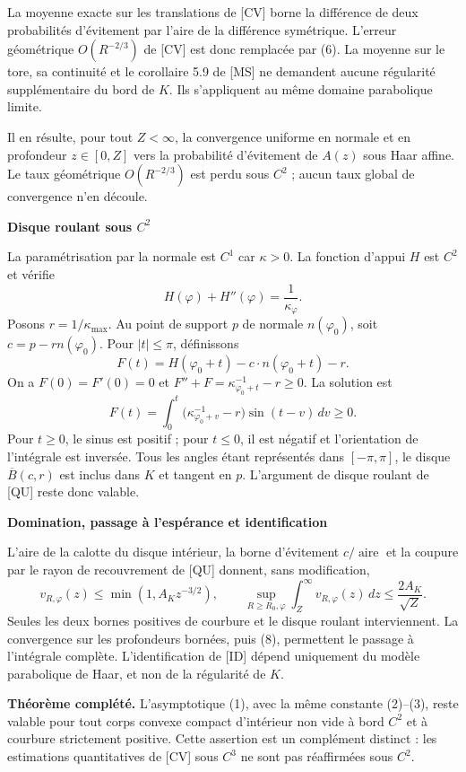 \documentclass[11pt,a4paper]{article}
\newcommand{\area}{\operatorname{aire}}
\newcommand{\head}[1]{\vspace{3pt}{\large\bfseries\color{navy}#1}\par}
\newcommand{\subhead}[1]{{\bfseries\color{navy}#1}\par}
\begin{document}
\newpage
\head{3. Complément $C^2$ : convergence et espérance}
La moyenne exacte sur les translations de [CV] borne la différence de deux probabilités d'évitement par l'aire de la différence symétrique. L'erreur géométrique $O(R^{-2/3})$ de [CV] est donc remplacée par (6). La moyenne sur le tore, sa continuité et le corollaire 5.9 de [MS] ne demandent aucune régularité supplémentaire du bord de $K$. Ils s'appliquent au même domaine parabolique limite.

Il en résulte, pour tout $Z<\infty$, la convergence uniforme en normale et en profondeur $z\in[0,Z]$ vers la probabilité d'évitement de $A(z)$ sous Haar affine. Le taux géométrique $O(R^{-2/3})$ est perdu sous $C^2$ ; aucun taux global de convergence n'en découle.

\subhead{Disque roulant sous $C^2$}
La paramétrisation par la normale est $C^1$ car $\kappa>0$. La fonction d'appui $H$ est $C^2$ et vérifie
\[
 H(\varphi)+H''(\varphi)=\frac1{\kappa_\varphi}.
\]
Posons $r=1/\kappa_{\max}$. Au point de support $p$ de normale $n(\varphi_0)$, soit $c=p-rn(\varphi_0)$. Pour $|t|\le\pi$, définissons
\[
 F(t)=H(\varphi_0+t)-c\cdot n(\varphi_0+t)-r.
\]
On a $F(0)=F'(0)=0$ et $F''+F=\kappa_{\varphi_0+t}^{-1}-r\ge0$. La solution est
\[
 F(t)=\int_0^t\bigl(\kappa_{\varphi_0+v}^{-1}-r\bigr)\sin(t-v)\,dv\ge0.\tag{7}
\]
Pour $t\ge0$, le sinus est positif ; pour $t\le0$, il est négatif et l'orientation de l'intégrale est inversée. Tous les angles étant représentés dans $[-\pi,\pi]$, le disque $\overline B(c,r)$ est inclus dans $K$ et tangent en $p$. L'argument de disque roulant de [QU] reste donc valable.

\subhead{Domination, passage à l'espérance et identification}
L'aire de la calotte du disque intérieur, la borne d'évitement $c/\area$ et la coupure par le rayon de recouvrement de [QU] donnent, sans modification,
\[
 v_{R,\varphi}(z)\le\min(1,A_Kz^{-3/2}),\qquad
 \sup_{R\ge R_0,\varphi}\int_Z^\infty v_{R,\varphi}(z)\,dz
 \le\frac{2A_K}{\sqrt Z}.\tag{8}
\]
Seules les deux bornes positives de courbure et le disque roulant interviennent. La convergence sur les profondeurs bornées, puis (8), permettent le passage à l'intégrale complète. L'identification de [ID] dépend uniquement du modèle parabolique de Haar, et non de la régularité de $K$.

\textbf{Théorème complété.} L'asymptotique (1), avec la même constante (2)--(3), reste valable pour tout corps convexe compact d'intérieur non vide à bord $C^2$ et à courbure strictement positive. Cette assertion est un complément distinct : les estimations quantitatives de [CV] sous $C^3$ ne sont pas réaffirmées sous $C^2$.
\end{document}
